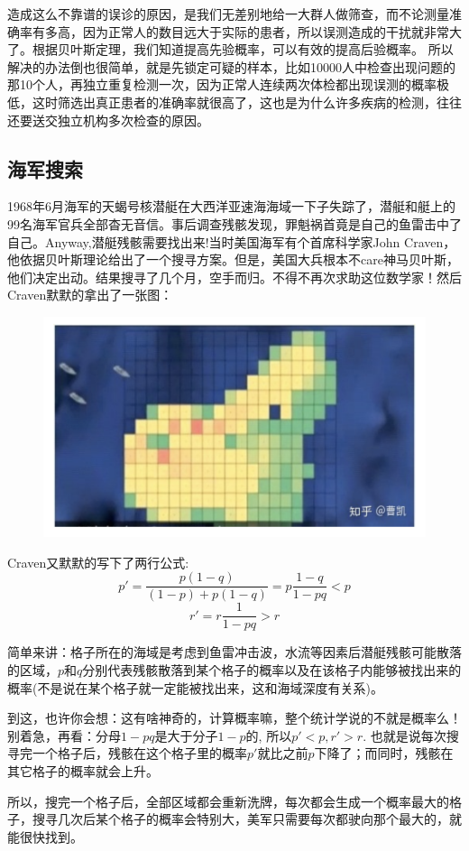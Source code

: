 \documentclass[12pt]{article}
\begin{document}
造成这么不靠谱的误诊的原因，是我们无差别地给一大群人做筛查，而不论测量准确率有多高，因为正常人的数目远大于实际的患者，所以误测造成的干扰就非常大了。根据贝叶斯定理，我们知道提高先验概率，可以有效的提高后验概率。
所以解决的办法倒也很简单，就是先锁定可疑的样本，比如10000人中检查出现问题的那10个人，再独立重复检测一次，因为正常人连续两次体检都出现误测的概率极低，这时筛选出真正患者的准确率就很高了，这也是为什么许多疾病的检测，往往还要送交独立机构多次检查的原因。

\subsection{海军搜索}
1968年6月海军的天蝎号核潜艇在大西洋亚速海海域一下子失踪了，潜艇和艇上的99名海军官兵全部杳无音信。事后调查残骸发现，罪魁祸首竟是自己的鱼雷击中了自己。Anyway,潜艇残骸需要找出来!当时美国海军有个首席科学家John Craven，他依据贝叶斯理论给出了一个搜寻方案。但是，美国大兵根本不care神马贝叶斯，他们决定出动。结果搜寻了几个月，空手而归。不得不再次求助这位数学家！然后Craven默默的拿出了一张图：
\begin{figure}[H]
    \centering
    \includegraphics[width=.5\textwidth]{fig/Bayesian_Example_3.png}
\end{figure}
Craven又默默的写下了两行公式:
$$
p' = \frac{p(1-q)}{(1-p) + p(1-q)} = p\frac{1-q}{1-pq} < p
$$
$$
r' = r\frac{1}{1-pq} > r
$$

简单来讲：格子所在的海域是考虑到鱼雷冲击波，水流等因素后潜艇残骸可能散落的区域，$p$和$q$分别代表残骸散落到某个格子的概率以及在该格子内能够被找出来的概率(不是说在某个格子就一定能被找出来，这和海域深度有关系)。

到这，也许你会想：这有啥神奇的，计算概率嘛，整个统计学说的不就是概率么！别着急，再看：分母$1-pq$是大于分子$1-p$的, 所以$p'<p, r'>r$. 也就是说每次搜寻完一个格子后，残骸在这个格子里的概率$p'$就比之前$p$下降了；而同时，残骸在其它格子的概率就会上升。

所以，搜完一个格子后，全部区域都会重新洗牌，每次都会生成一个概率最大的格子，搜寻几次后某个格子的概率会特别大，美军只需要每次都驶向那个最大的，就能很快找到。
\end{document}
